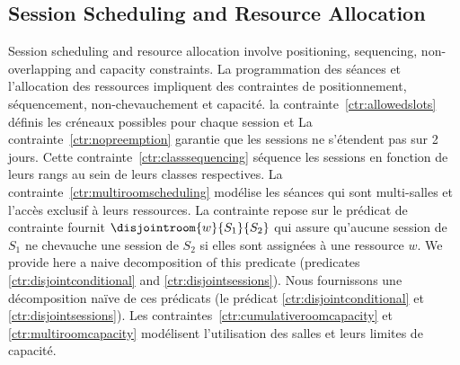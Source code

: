 \subsection{Session Scheduling and Resource Allocation}
\label{sec:model-scheduling}

Session scheduling and resource allocation involve positioning, sequencing, non-overlapping and capacity constraints. 
La programmation des séances et l'allocation des ressources impliquent des contraintes de positionnement, séquencement, non-chevauchement et capacité. 
la contrainte~\ref{ctr:allowedslots} définis les créneaux possibles pour chaque session
et
La contrainte~\ref{ctr:nopreemption} garantie que les sessions ne s'étendent pas sur 2 jours. 
Cette contrainte~\ref{ctr:classsequencing} séquence les sessions en fonction de leurs rangs au sein de leurs classes respectives.
La contrainte~\ref{ctr:multiroomscheduling} modélise les séances qui sont multi-salles et l'accès exclusif à leurs ressources.
La contrainte repose sur le prédicat de contrainte fournit $\disjointroom{w}{S_1}{S_2}$ qui assure qu'aucune session de $S_1$ ne chevauche une session de $S_2$ si elles sont assignées à une ressource $w$.
We provide here a naive decomposition of this predicate (predicates \ref{ctr:disjointconditional} and \ref{ctr:disjointsessions}).
Nous fournissons
une décomposition naïve de ces prédicats (le prédicat \ref{ctr:disjointconditional} et \ref{ctr:disjointsessions}).
Les contraintes~\ref{ctr:cumulativeroomcapacity} et \ref{ctr:multiroomcapacity} modélisent l'utilisation des salles et leurs limites de capacité. 
